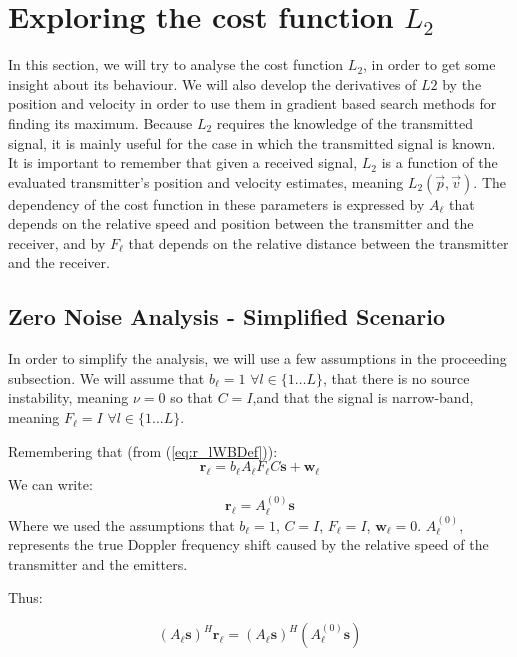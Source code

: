 
\chapter{Exploring the cost function $L_2$} %
\label{Chapter3}

In this section, we will try to analyse the cost function $L_2$, in order to get
some insight about its behaviour. We will also develop the derivatives of $L2$ by the position and velocity in order to use them in gradient based search methods for finding its maximum.
Because $L_2$ requires the knowledge of the transmitted signal, it is mainly useful for
the case in which the transmitted signal is known.
\\
It is important to remember that given a received signal, $L_2$ is a function
of the evaluated transmitter's position and velocity estimates, meaning $L_2(\vec{p},\vec{v})$.
The dependency of the cost function in these parameters is expressed by $A_\ell$ that depends
on the relative speed and position between the transmitter and the receiver, and by $F_\ell$ that depends
on the relative distance between the transmitter and the receiver.

\section{Zero Noise Analysis - Simplified Scenario}

In order to simplify the analysis, we will use a few assumptions in the proceeding subsection.
We will assume that $b_\ell=1$ $\forall l\in\{1\dots L\}$, that there is no source instability, meaning $\nu=0$ so that $C=I$,and that the signal is narrow-band, meaning $F_\ell=I$ $\forall l\in\{1\dots L\}$.

Remembering that (from (\ref{eq:r_lWBDef})):
$$\mathbf{r_\ell}=b_\ell A_\ell F_\ell C \mathbf{s} + \mathbf{w_\ell}$$
We can write:
\begin{equation}
\mathbf{r_\ell}= A^{(0)}_\ell \mathbf{s}
\end{equation}
Where we used the assumptions that $b_\ell=1$, $C=I$, $F_\ell=I$, $\mathbf{w}_\ell=0$. $A^{(0)}_\ell$, represents the
true Doppler frequency shift caused by the relative speed of the transmitter and the emitters.

Thus:

\begin{equation}
\label{eq:simplifiedanalysis1}
(A_\ell\mathbf{s})^H\mathbf{r_\ell}=(A_\ell\mathbf{s})^H(A^{(0)}_\ell \mathbf{s})
\end{equation}

